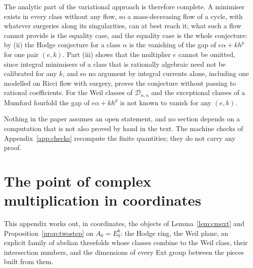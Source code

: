 \documentclass[11pt,reqno]{amsart}
\numberwithin{equation}{section}
\theoremstyle{plain}
\theoremstyle{definition}
\newcommand{\cD}{\mathcal{D}}
\begin{document}
The analytic part of the variational approach is therefore complete. A minimiser exists in every class without any flow, so a mass-decreasing flow of a cycle, with whatever surgeries along its singularities, can at best reach it; what such a flow cannot provide is the equality case, and the equality case is the whole conjecture: by (ii) the Hodge conjecture for a class $\alpha$ is the vanishing of the gap of $e\alpha+kh^{p}$ for one pair $(e,k)$. Part (iii) shows that the multiplier $e$ cannot be omitted, since integral minimisers of a class that is rationally algebraic need not be calibrated for any $k$, and so no argument by integral currents alone, including one modelled on Ricci flow with surgery, proves the conjecture without passing to rational coefficients. For the Weil classes of $\cD_{n,n}$ and the exceptional classes of a Mumford fourfold the gap of $e\alpha+kh^{p}$ is not known to vanish for any $(e,k)$.

Nothing in the paper assumes an open statement, and no section depends on a computation that is not also proved by hand in the text. The machine checks of Appendix~\ref{app:checks} recompute the finite quantities; they do not carry any proof.




\appendix
\section{The point of complex multiplication in coordinates}\label{app:cmpoint}

This appendix works out, in coordinates, the objects of Lemma~\ref{lem:cmext} and Proposition~\ref{prop:twostep} on $A_{0}=E_{0}^{6}$: the Hodge ring, the Weil plane, an explicit family of abelian threefolds whose classes combine to the Weil class, their intersection numbers, and the dimensions of every Ext group between the pieces built from them.
\end{document}
